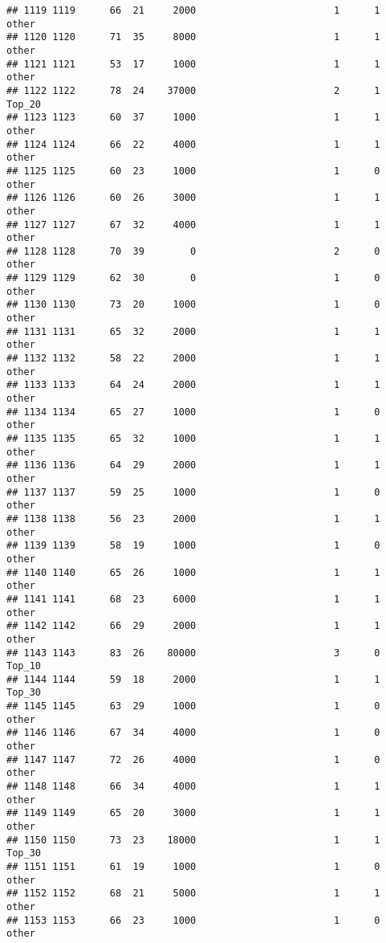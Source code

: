 \documentclass[
]{article}
\begin{document}
\begin{verbatim}
## 1119 1119      66  21     2000                        1      1    other
## 1120 1120      71  35     8000                        1      1    other
## 1121 1121      53  17     1000                        1      1    other
## 1122 1122      78  24    37000                        2      1   Top_20
## 1123 1123      60  37     1000                        1      1    other
## 1124 1124      66  22     4000                        1      1    other
## 1125 1125      60  23     1000                        1      0    other
## 1126 1126      60  26     3000                        1      1    other
## 1127 1127      67  32     4000                        1      1    other
## 1128 1128      70  39        0                        2      0    other
## 1129 1129      62  30        0                        1      0    other
## 1130 1130      73  20     1000                        1      0    other
## 1131 1131      65  32     2000                        1      1    other
## 1132 1132      58  22     2000                        1      1    other
## 1133 1133      64  24     2000                        1      1    other
## 1134 1134      65  27     1000                        1      0    other
## 1135 1135      65  32     1000                        1      1    other
## 1136 1136      64  29     2000                        1      1    other
## 1137 1137      59  25     1000                        1      0    other
## 1138 1138      56  23     2000                        1      1    other
## 1139 1139      58  19     1000                        1      0    other
## 1140 1140      65  26     1000                        1      1    other
## 1141 1141      68  23     6000                        1      1    other
## 1142 1142      66  29     2000                        1      1    other
## 1143 1143      83  26    80000                        3      0   Top_10
## 1144 1144      59  18     2000                        1      1   Top_30
## 1145 1145      63  29     1000                        1      0    other
## 1146 1146      67  34     4000                        1      0    other
## 1147 1147      72  26     4000                        1      0    other
## 1148 1148      66  34     4000                        1      1    other
## 1149 1149      65  20     3000                        1      1    other
## 1150 1150      73  23    18000                        1      1   Top_30
## 1151 1151      61  19     1000                        1      0    other
## 1152 1152      68  21     5000                        1      1    other
## 1153 1153      66  23     1000                        1      0    other

\end{verbatim}
\end{document}
